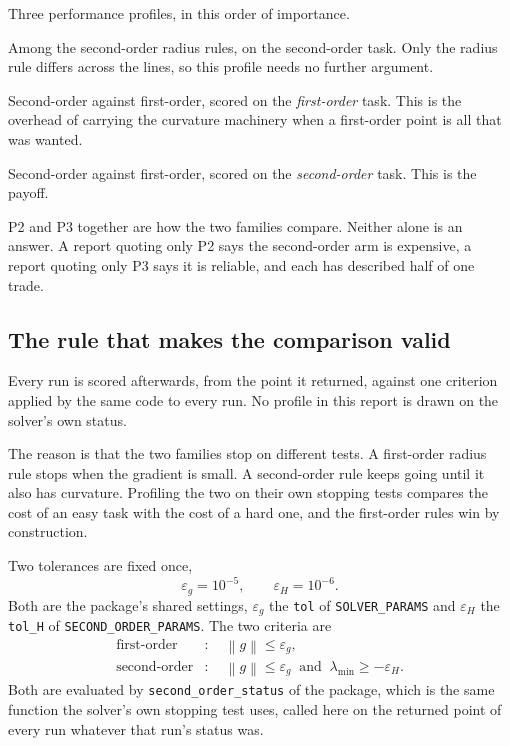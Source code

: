 \documentclass[11pt,a4paper]{article}
\providecommand{\norm}[1]{\left \lVert #1 \right \rVert}
\theoremstyle{remark}
\begin{document}
Three performance profiles, in this order of importance.

\begin{description}[leftmargin=2.2em, style=nextline]
  \item[P1] Among the second-order radius rules, on the second-order task. Only
    the radius rule differs across the lines, so this profile needs no further
    argument.
  \item[P2] Second-order against first-order, scored on the \emph{first-order}
    task. This is the overhead of carrying the curvature machinery when a
    first-order point is all that was wanted.
  \item[P3] Second-order against first-order, scored on the \emph{second-order}
    task. This is the payoff.
\end{description}

P2 and P3 together are how the two families compare. Neither alone is an answer.
A report quoting only P2 says the second-order arm is expensive, a report quoting
only P3 says it is reliable, and each has described half of one trade.

\subsection{The rule that makes the comparison valid}\label{sec: scoring}

Every run is scored afterwards, from the point it returned, against one criterion
applied by the same code to every run. No profile in this report is drawn on the
solver's own status.

The reason is that the two families stop on different tests. A first-order radius
rule stops when the gradient is small. A second-order rule keeps going until it
also has curvature. Profiling the two on their own stopping tests compares the
cost of an easy task with the cost of a hard one, and the first-order rules win by
construction.

Two tolerances are fixed once,
\begin{equation}
  \varepsilon_g = 10^{-5}, \qquad \varepsilon_H = 10^{-6} .
  \label{eqn: tolerances}
\end{equation}
Both are the package's shared settings, $\varepsilon_g$ the \texttt{tol} of
\texttt{SOLVER\_PARAMS} and $\varepsilon_H$ the \texttt{tol\_H} of
\texttt{SECOND\_ORDER\_PARAMS}. The two criteria are
\begin{align}
  \text{first-order} &: \quad \norm{g} \leq \varepsilon_g ,
  \label{eqn: first order criterion} \\
  \text{second-order} &: \quad \norm{g} \leq \varepsilon_g
     \ \text{ and } \ \lambda_{\min} \geq -\varepsilon_H .
  \label{eqn: second order criterion}
\end{align}
Both are evaluated by \texttt{second\_order\_status} of the package, which is the
same function the solver's own stopping test uses, called here on the returned
point of every run whatever that run's status was.
\end{document}
